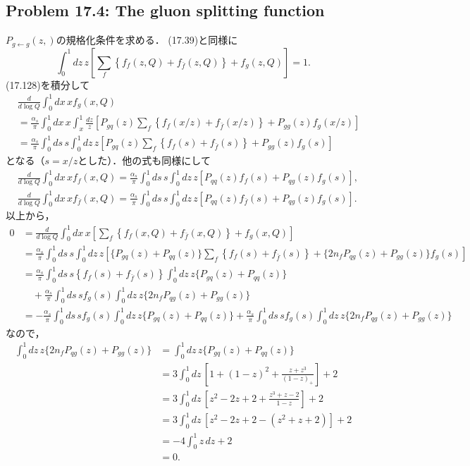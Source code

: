 \subsection{Problem 17.4: The gluon splitting function}
$P_{g\leftarrow g}(z,)$の規格化条件を求める．
(17.39)と同様に
\[
\int_0^1 dz \, z \left[ \sum_f \left\{ f_f(z, Q) + f_{\bar{f}}(z, Q) \right\} + f_g(z, Q) \right] = 1 .
\]
(17.128)を積分して
\begin{align*}
  & \frac{d}{d\log Q} \int_0^1 dx \, x f_g(x, Q) \\
  &= \frac{\alpha_s}{\pi} \int_0^1 dx \, x \int_x^1 \frac{dz}{z}
  \left[ P_{gq}(z) \sum_f \left\{ f_f(x/z) + f_{\bar{f}}(x/z) \right\} + P_{gg}(z) f_g(x/z) \right] \\
  &= \frac{\alpha_s}{\pi} \int_0^1 ds \, s \int_0^1 dz \, z
  \left[ P_{gq}(z) \sum_f \left\{ f_f(s) + f_{\bar{f}}(s) \right\} + P_{gg}(z) f_g(s) \right]
\end{align*}
となる（$s = x/z$とした）．他の式も同様にして
\begin{align*}
  & \frac{d}{d\log Q} \int_0^1 dx \, x f_f(x, Q)
  = \frac{\alpha_s}{\pi} \int_0^1 ds \, s \int_0^1 dz \, z \left[ P_{qq}(z) f_f(s) + P_{qg}(z) f_g(s) \right] , \\
  & \frac{d}{d\log Q} \int_0^1 dx \, x f_{\bar{f}}(x, Q)
  = \frac{\alpha_s}{\pi} \int_0^1 ds \, s \int_0^1 dz \, z \left[ P_{qq}(z) f_{\bar{f}}(s) + P_{qg}(z) f_g(s) \right] .
\end{align*}
以上から，
\begin{align*}
  0 &= \frac{d}{d\log Q} \int_0^1 dx \, x \left[ \sum_f \left\{ f_f(x, Q) + f_{\bar{f}}(x, Q) \right\} + f_g(x, Q) \right] \\
  &= \frac{\alpha_s}{\pi} \int_0^1 ds \, s \int_0^1 dz \, z
  \left[ \{P_{gq}(z)+P_{qq}(z)\} \sum_f \left\{ f_f(s) + f_{\bar{f}}(s) \right\} + \{2n_f P_{qg}(z) + P_{gg}(z)\} f_g(s) \right] \\
  &= \frac{\alpha_s}{\pi} \int_0^1 ds \, s \left\{ f_f(s) + f_{\bar{f}}(s) \right\} \int_0^1 dz \, z \{P_{gq}(z)+P_{qq}(z)\} \\
  & \quad+ \frac{\alpha_s}{\pi} \int_0^1 ds \, s f_g(s) \int_0^1 dz \, z \{2n_f P_{qg}(z) + P_{gg}(z)\} \\
  &= - \frac{\alpha_s}{\pi} \int_0^1 ds \, s f_g(s) \int_0^1 dz \, z \{P_{gq}(z)+P_{qq}(z)\}
  + \frac{\alpha_s}{\pi} \int_0^1 ds \, s f_g(s) \int_0^1 dz \, z \{2n_f P_{qg}(z) + P_{gg}(z)\}
\end{align*}
なので，
\begin{align*}
  \int_0^1 dz \, z \{2n_f P_{qg}(z) + P_{gg}(z)\}
  &= \int_0^1 dz \, z \{P_{gq}(z)+P_{qq}(z)\} \\
  &= 3 \int_0^1 dz \, \left[ 1 + (1-z)^2 + \frac{z+z^3}{(1-z)_+} \right] + 2 \\
  &= 3 \int_0^1 dz \, \left[ z^2-2z+2 + \frac{z^3+z-2}{1-z} \right] + 2 \\
  &= 3 \int_0^1 dz \, \left[ z^2-2z+2 - (z^2+z+2) \right] + 2 \\
  &= - 4 \int_0^1 z \, dz + 2 \\
  &= 0 .
\end{align*}

